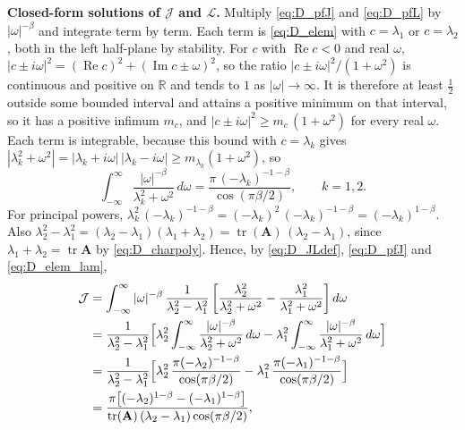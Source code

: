 \documentclass[12pt]{article}
\newcommand{\tr}{\operatorname{tr}}
\newcommand{\re}{\operatorname{Re}}
\newcommand{\R}{\mathbb{R}}
\begin{document}
\textbf{Closed-form solutions of $\mathcal{J}$ and $\mathcal{L}$.} Multiply \eqref{eq:D_pfJ} and \eqref{eq:D_pfL} by $|\omega|^{-\beta}$ and integrate term by term. Each
term is \eqref{eq:D_elem} with $c=\lambda_1$ or $c=\lambda_2$, both in the left half-plane by stability. For $c$ with $\re c<0$
and real $\omega$, $|c\pm i\omega|^2=(\re c)^2+(\operatorname{Im}c\pm\omega)^2$, so the ratio $|c\pm i\omega|^2/(1+\omega^2)$ is continuous and
positive on $\R$ and tends to $1$ as $|\omega|\to\infty$. It is therefore at least $\frac12$ outside some bounded interval and attains a positive
minimum on that interval, so it has a positive infimum $m_c$, and
$|c\pm i\omega|^2\ge m_c\,(1+\omega^2)$ for every real $\omega$. Each term is integrable, because this bound with
$c=\lambda_k$ gives $|\lambda_k^2+\omega^2|=|\lambda_k+i\omega|\,|\lambda_k-i\omega|\ge m_{\lambda_k}(1+\omega^2)$, so
\begin{equation}
    \int_{-\infty}^{\infty}\frac{|\omega|^{-\beta}}{\lambda_k^2+\omega^2}\,d\omega=\frac{\pi\,(-\lambda_k)^{-1-\beta}}{\cos(\pi\beta/2)},
    \qquad k=1,2.
    \label{eq:D_elem_lam}
\end{equation}
For principal powers, $\lambda_k^2\,(-\lambda_k)^{-1-\beta}=(-\lambda_k)^2\,(-\lambda_k)^{-1-\beta}=(-\lambda_k)^{1-\beta}$. Also
$\lambda_2^2-\lambda_1^2=(\lambda_2-\lambda_1)(\lambda_1+\lambda_2)=\tr(\mathbf{A})\,(\lambda_2-\lambda_1)$, since
$\lambda_1+\lambda_2=\tr\mathbf{A}$ by \eqref{eq:D_charpoly}. Hence, by \eqref{eq:D_JLdef}, \eqref{eq:D_pfJ} and \eqref{eq:D_elem_lam},
\begin{equation}
\begin{aligned}
    \mathcal{J}&=\int_{-\infty}^{\infty}|\omega|^{-\beta}\,\frac{1}{\lambda_2^2-\lambda_1^2}
      \left[\frac{\lambda_2^2}{\lambda_2^2+\omega^2}-\frac{\lambda_1^2}{\lambda_1^2+\omega^2}\right]d\omega\\
    &=\frac{1}{\lambda_2^2-\lambda_1^2}\Bigl[\lambda_2^2\int_{-\infty}^{\infty}\frac{|\omega|^{-\beta}}{\lambda_2^2+\omega^2}\,d\omega
      -\lambda_1^2\int_{-\infty}^{\infty}\frac{|\omega|^{-\beta}}{\lambda_1^2+\omega^2}\,d\omega\Bigr]\\
    &=\frac{1}{\lambda_2^2-\lambda_1^2}\Bigl[\lambda_2^2\,\frac{\pi(-\lambda_2)^{-1-\beta}}{\cos(\pi\beta/2)}
      -\lambda_1^2\,\frac{\pi(-\lambda_1)^{-1-\beta}}{\cos(\pi\beta/2)}\Bigr]\\
    &=\frac{\pi\bigl[(-\lambda_2)^{1-\beta}-(-\lambda_1)^{1-\beta}\bigr]}{\tr(\mathbf{A})\,(\lambda_2-\lambda_1)\cos(\pi\beta/2)},
\end{aligned}
    \label{eq:D_Jchain}
\end{equation}
\end{document}
